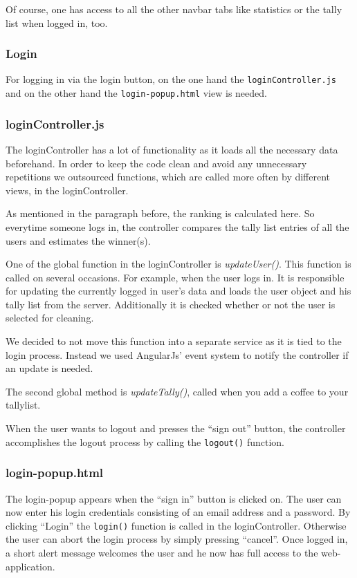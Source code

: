 Of course, one has access to all the other navbar tabs like statistics
or the tally list when logged in, too.

\subsubsection{Login}\label{login}

For logging in via the login button, on the one hand the
\texttt{loginController.js} and on the other hand the
\texttt{login-popup.html} view is needed.

\subsubsection*{loginController.js}

The loginController has a lot of functionality as it loads all the
necessary data beforehand. In order to keep the code clean and avoid any
unnecessary repetitions we outsourced functions, which are called more
often by different views, in the loginController.

As mentioned in the paragraph before, the ranking is calculated here. So
everytime someone logs in, the controller compares the tally list
entries of all the users and estimates the winner(s).

One of the global function in the loginController is
\emph{updateUser()}. This function is called on several occasions. For
example, when the user logs in. It is responsible for updating the
currently logged in user's data and loads the user object and his tally
list from the server. Additionally it is checked whether or not the user
is selected for cleaning.

We decided to not move this function into a separate service as it is
tied to the login process. Instead we used AngularJs' event system to
notify the controller if an update is needed.

The second global method is \emph{updateTally()}, called when you add a
coffee to your tallylist.

When the user wants to logout and presses the ``sign out'' button, the
controller accomplishes the logout process by calling the
\texttt{logout()} function.

\subsubsection*{login-popup.html}

The login-popup appears when the ``sign in'' button is clicked on. The
user can now enter his login credentials consisting of an email address
and a password. By clicking ``Login'' the \texttt{login()} function is
called in the loginController. Otherwise the user can abort the login
process by simply pressing ``cancel''. Once logged in, a short alert
message welcomes the user and he now has full access to the
web-application.

